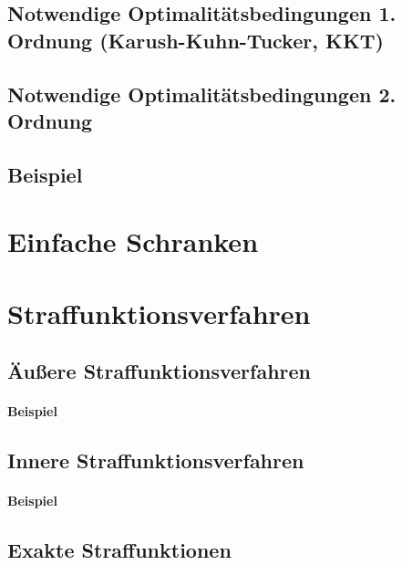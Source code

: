 		\subsection{Notwendige Optimalitätsbedingungen 1. Ordnung (Karush-Kuhn-Tucker, KKT)} %

		\subsection{Notwendige Optimalitätsbedingungen 2. Ordnung} %

		\subsection{Beispiel} %

	\section{Einfache Schranken} %

	\section{Straffunktionsverfahren} %

		\subsection{Äußere Straffunktionsverfahren} %

			\paragraph{Beispiel} %

		\subsection{Innere Straffunktionsverfahren} %

			\paragraph{Beispiel} %

		\subsection{Exakte Straffunktionen} %

